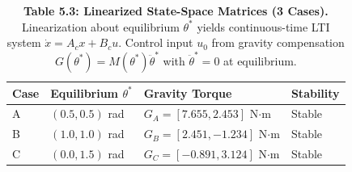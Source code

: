 \begin{table}[H]
\centering
\caption{\textbf{Table 5.3: Linearized State-Space Matrices (3 Cases).} Linearization about equilibrium $\theta^*$ yields continuous-time LTI system $\dot{x} = A_c x + B_c u$. Control input $u_0$ from gravity compensation $G(\theta^*) = M(\theta^*) \ddot{\theta}^*$ with $\ddot{\theta}^* = 0$ at equilibrium.}
\label{tab:5-3}
\small
\begin{tabular}{llll}
\toprule
\textbf{Case} & \textbf{Equilibrium $\theta^*$} & \textbf{Gravity Torque} & \textbf{Stability} \\
\midrule
\rowcolor{gray!15}
A & $(0.5, 0.5)$ rad & $G_A = [7.655, 2.453]$ N$\cdot$m & Stable \\
B & $(1.0, 1.0)$ rad & $G_B = [2.451, -1.234]$ N$\cdot$m & Stable \\
\rowcolor{gray!15}
C & $(0.0, 1.5)$ rad & $G_C = [-0.891, 3.124]$ N$\cdot$m & Stable \\
\bottomrule
\end{tabular}
\end{table}
